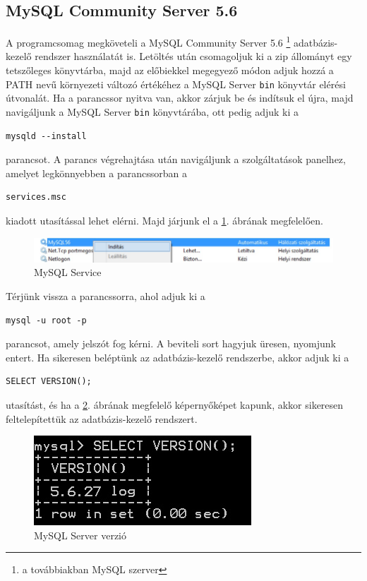  \subsection{MySQL Community Server 5.6} \label{subsec:mysql_server}
 A programcsomag megköveteli a MySQL Community Server 5.6 \footnote{a továbbiakban MySQL szerver} \cite{mysqlsite} adatbázis-kezelő rendszer használatát is. Letöltés után csomagoljuk ki a zip állományt egy tetszőleges könyvtárba, majd az előbiekkel megegyező módon adjuk hozzá a PATH nevű környezeti változó értékéhez a MySQL Server \texttt{bin} könyvtár elérési útvonalát. Ha a parancssor nyitva van, akkor zárjuk be és indítsuk el újra, majd navigáljunk a MySQL Server \texttt{bin} könyvtárába, ott pedig adjuk ki a
 \begin{Verbatim}[xleftmargin=.5in]
mysqld --install
\end{Verbatim}
parancsot. A parancs végrehajtása után navigáljunk a szolgáltatások panelhez, amelyet legkönnyebben a parancssorban a
 \begin{Verbatim}[xleftmargin=.5in]
services.msc
\end{Verbatim}
kiadott utasítással lehet elérni. Majd járjunk el a \ref{fig:mysql_service}. ábrának megfelelően. 

\begin{figure}[h!]
  \caption{MySQL Service}
  \label{fig:mysql_service}
  \centering
    \includegraphics{user-documentation/images/mysql_service.jpg}
\end{figure}
Térjünk vissza a parancssorra, ahol adjuk ki a 
 \begin{Verbatim}[xleftmargin=.5in]
mysql -u root -p
\end{Verbatim}
parancsot, amely jelszót fog kérni. A beviteli sort hagyjuk üresen, nyomjunk entert. Ha sikeresen beléptünk az adatbázis-kezelő rendszerbe, akkor adjuk ki a
 \begin{Verbatim}[xleftmargin=.5in]
SELECT VERSION();
\end{Verbatim}
utasítást, és ha a \ref{fig:mysql_version}. ábrának megfelelő képernyőképet kapunk, akkor sikeresen feltelepítettük az adatbázis-kezelő rendszert.
\begin{figure}[h!]
  \caption{MySQL Server verzió}
  \label{fig:mysql_version}
  \centering
    \includegraphics{user-documentation/images/mysql_version.jpg}
\end{figure}

